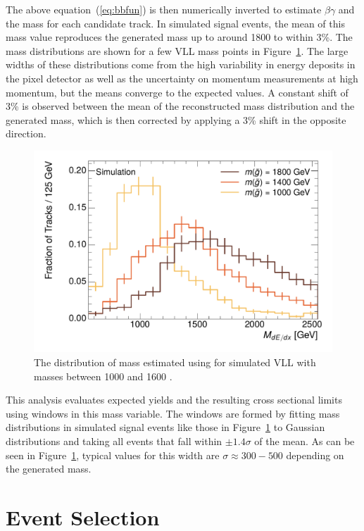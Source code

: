 The above equation~(\ref{eq:bbfun}) is then numerically inverted to estimate $\beta\gamma$ and the mass for each candidate track.
In simulated signal events, the mean of this mass value reproduces the generated mass up to around 1800 \GeV to within 3\%.
The mass distributions are shown for a few \ac{VLL} mass points in Figure~\ref{fig:mass_dedx}.
The large widths of these distributions come from the high variability in energy deposits in the pixel detector as well as the uncertainty on momentum measurements at high momentum, but the means converge to the expected values.
A constant shift of 3\% is observed between the mean of the reconstructed mass distribution and the generated mass, which is then corrected by applying a 3\% shift in the opposite direction.

\begin{figure}
\centering
\includegraphics[width=\fullfig]{figures/mass_dedx.pdf}
\caption{The distribution of mass estimated using \dedx for simulated \ac{VLL} \rhadrons with masses between 1000 and 1600 \GeV.}
\label{fig:mass_dedx}
\end{figure}

This analysis evaluates expected yields and the resulting cross sectional limits using windows in this mass variable.
The windows are formed by fitting mass distributions in simulated signal events like those in Figure~\ref{fig:mass_dedx} to Gaussian distributions and taking all events that fall within $\pm 1.4 \sigma$ of the mean.
As can be seen in Figure~\ref{fig:mass_dedx}, typical values for this width are $\sigma \approx 300-500$ \GeV depending on the generated mass.

\section{Event Selection}
\label{sec:efficiency}

